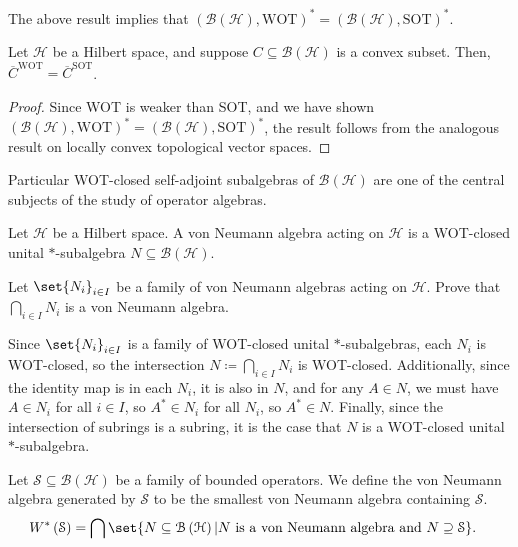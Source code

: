 \documentclass[10pt]{mypackage}
\begin{document}
\begin{remark}
  The above result implies that $\left(\mathcal{B}\left(\mathcal{H}\right),\text{WOT}\right)^{\ast} = \left(\mathcal{B}\left(\mathcal{H}\right),\text{SOT}\right)^{\ast}$.
\end{remark}

\begin{corollary}
  Let $\mathcal{H}$ be a Hilbert space, and suppose $C\subseteq \mathcal{B}\left(\mathcal{H}\right)$ is a convex subset. Then, $\overline{C}^{\text{WOT}} = \overline{C}^{\text{SOT}}$.
\end{corollary}
\begin{proof}
  Since WOT is weaker than SOT, and we have shown $\left(\mathcal{B}\left(\mathcal{H}\right),\text{WOT}\right)^{\ast} = \left(\mathcal{B}\left(\mathcal{H}\right),\text{SOT}\right)^{\ast}$, the result follows from the analogous result on locally convex topological vector spaces.
\end{proof}
Particular WOT-closed self-adjoint subalgebras of $\mathcal{B}\left(\mathcal{H}\right)$ are one of the central subjects of the study of operator algebras. 
\begin{definition}
  Let $\mathcal{H}$ be a Hilbert space. A von Neumann algebra acting on $\mathcal{H}$ is a WOT-closed unital $\ast$-subalgebra $N\subseteq \mathcal{B}\left(\mathcal{H}\right)$.
\end{definition}
\begin{exercise}
  Let $\set{N_i}_{i\in I}$ be a family of von Neumann algebras acting on $\mathcal{H}$. Prove that $\bigcap_{i\in I}N_i$ is a von Neumann algebra.
\end{exercise}
\begin{solution}
  Since $\set{N_i}_{i\in I}$ is a family of WOT-closed unital $\ast$-subalgebras, each $N_i$ is WOT-closed, so the intersection $N \coloneq \bigcap_{i\in I}N_i$ is WOT-closed. Additionally, since the identity map is in each $N_i$, it is also in $N$, and for any $A\in N$, we must have $A\in N_i$ for all $i\in I$, so $A^{\ast}\in N_i$ for all $N_i$, so $A^{\ast}\in N$. Finally, since the intersection of subrings is a subring, it is the case that $N$ is a WOT-closed unital $\ast$-subalgebra.
\end{solution}
\begin{example}
  Let $\mathcal{S} \subseteq \mathcal{B}\left(\mathcal{H}\right)$ be a family of bounded operators. We define the von Neumann algebra generated by $\mathcal{S}$ to be the smallest von Neumann algebra containing $\mathcal{S}$.
  \begin{align*}
    W^{\ast}\left(\mathcal{S}\right) &= \bigcap\set{N\subseteq \mathcal{B}\left(\mathcal{H}\right) | N\text{ is a von Neumann algebra and }N\supseteq \mathcal{S}}.
  \end{align*}
\end{example}
\end{document}
